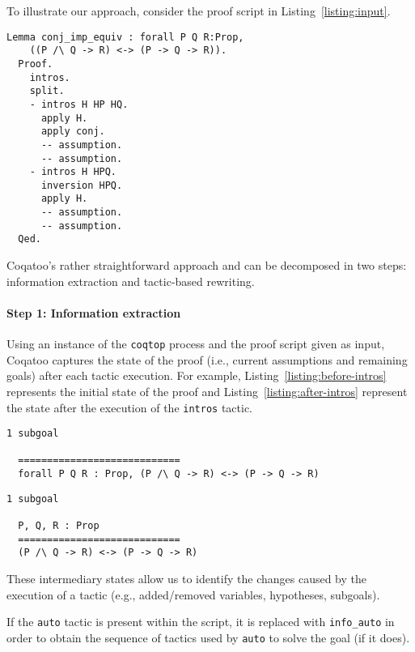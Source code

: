 \documentclass[sigplan,review,9pt]{acmart}\settopmatter{printfolios=true,printccs=false,printacmref=false}
\begin{document}
To illustrate our approach, consider the proof script in Listing~\ref{listing:input}.
\begin{lstlisting}[label=listing:input,captionpos=b,caption=Input]
  Lemma conj_imp_equiv : forall P Q R:Prop, 
    ((P /\ Q -> R) <-> (P -> Q -> R)).
  Proof.
    intros.
    split.
    - intros H HP HQ.
      apply H.
      apply conj.
      -- assumption.
      -- assumption.
    - intros H HPQ.
      inversion HPQ.
      apply H.
      -- assumption.
      -- assumption.
  Qed.
\end{lstlisting}

Coqatoo's rather straightforward approach and can be decomposed in two steps: information extraction and tactic-based rewriting. 

\paragraph{Step 1: Information extraction}
Using an instance of the \texttt{coqtop} process and the proof script given as input, Coqatoo captures the state of the proof (i.e., current assumptions and remaining goals) after each tactic execution. For example, Listing~\ref{listing:before-intros} represents the initial state of the proof and Listing~\ref{listing:after-intros} represent the state after the execution of the \lstinline{intros} tactic.
\begin{lstlisting}[label=listing:before-intros, captionpos=b,caption={State before executing the first intros tactic}]
  1 subgoal
  
  ============================
  forall P Q R : Prop, (P /\ Q -> R) <-> (P -> Q -> R)
\end{lstlisting}

\begin{lstlisting}[label=listing:after-intros,captionpos=b,caption={State after executing the first intros tactic}]
  1 subgoal
  
  P, Q, R : Prop
  ============================
  (P /\ Q -> R) <-> (P -> Q -> R)
\end{lstlisting}
These intermediary states allow us to identify the changes caused by the execution of a tactic (e.g., added/removed variables, hypotheses, subgoals).

If the \lstinline{auto} tactic is present within the script, it is replaced with \lstinline{info_auto} in order to obtain the sequence of tactics used by \lstinline{auto} to solve the goal (if it does).
\end{document}
